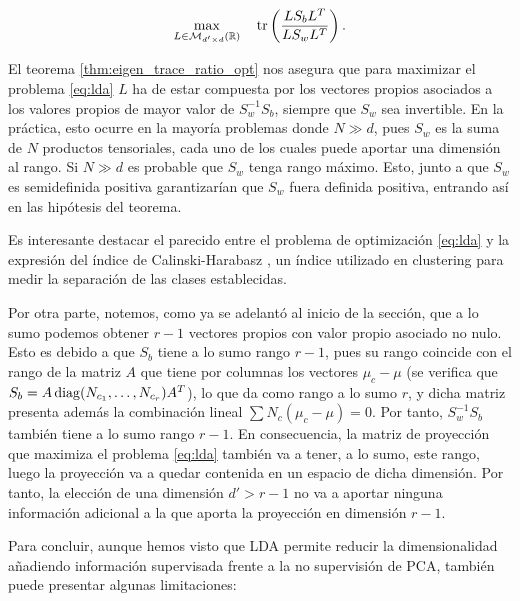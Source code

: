 \begin{equation} \label{eq:lda}
    \max_{\substack{L \in \mathcal{M}_{d'\times d}(\mathbb{R}) }} \quad \operatorname{tr}\left(\frac{L S_b L^T}{LS_wL^T}\right).
\end{equation}


El teorema \ref{thm:eigen_trace_ratio_opt} nos asegura que para maximizar el problema \ref{eq:lda} $L$ ha de estar compuesta por los vectores propios asociados a los valores propios de mayor valor de $S_w^{-1}S_b$, siempre que $S_w$ sea invertible. En la práctica, esto ocurre en la mayoría problemas donde $N \gg d$, pues $S_w$ es la suma de $N$ productos tensoriales, cada uno de los cuales puede aportar una dimensión al rango. Si $N \gg d$ es probable que $S_w$ tenga rango máximo. Esto, junto a que $S_w$ es semidefinida positiva garantizarían que $S_w$ fuera definida positiva, entrando así en las hipótesis del teorema.

Es interesante destacar el parecido entre el problema de optimización \ref{eq:lda} y la expresión del índice de Calinski-Harabasz \cite{maulik2002performance}, un índice utilizado en clustering para medir la separación de las clases establecidas.

Por otra parte, notemos, como ya se adelantó al inicio de la sección, que a lo sumo podemos obtener $r-1$ vectores propios con valor propio asociado no nulo. Esto es debido a que $S_b$ tiene a lo sumo rango $r-1$, pues su rango coincide con el rango de la matriz $A$ que tiene por columnas los vectores $\mu_c - \mu$ (se verifica que $S_b = A \operatorname{diag}(N_{c_1},\dots,N_{c_r}) A^T$), lo que da como rango a lo sumo $r$, y dicha matriz presenta además la combinación lineal $\sum N_c(\mu_c- \mu) = 0$. Por tanto, $S_w^{-1}S_b$ también tiene a lo sumo rango $r-1$. En consecuencia, la matriz de proyección que maximiza el problema \ref{eq:lda} también va a tener, a lo sumo, este rango, luego la proyección va a quedar contenida en un espacio de dicha dimensión. Por tanto, la elección de una dimensión $d' > r-1$ no va a aportar ninguna información adicional a la que aporta la proyección en dimensión $r-1$.

Para concluir, aunque hemos visto que LDA permite reducir la dimensionalidad añadiendo información supervisada frente a la no supervisión de PCA, también puede presentar algunas limitaciones:

